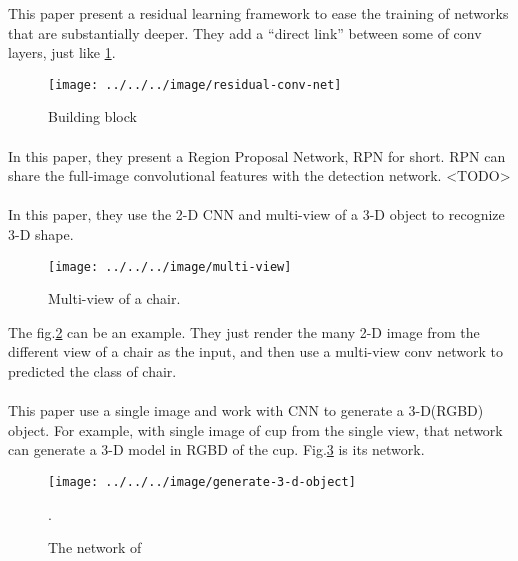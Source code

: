 \documentclass[border=0.5in]{blog}
\begin{document}
    This paper present a residual learning framework to ease the training of networks that are substantially deeper. They add a ``direct link'' between 
    some of conv layers, just like \ref{fig:residual-conv-net-block}.
    
    \begin{figure}
        \centering
        \texttt{[image: ../../../image/residual-conv-net]}
        \caption{Building block}
        \label{fig:residual-conv-net-block}
    \end{figure}
    
    \paragraph{\citep{DBLP:journals/corr/RenHG015}}
    
    In this paper, they present a Region Proposal Network, RPN for short.
    RPN can share the full-image convolutional features with the detection network.
    <TODO>
    
    \paragraph{\citep{DBLP:journals/corr/SuMKL15}}
    
    In this paper, they use the 2-D CNN and multi-view of a 3-D object to recognize
    3-D shape.
    \begin{figure}
        \centering
        \texttt{[image: ../../../image/multi-view]}
        \caption{Multi-view of a chair.}
        \label{fig:chair-multi-view}
    \end{figure}
    The fig.\ref{fig:chair-multi-view} can be an example. They just render the many
    2-D image from the different view of a chair as the input, and then use a multi-view conv network to predicted the class of chair.
    
    \paragraph{\citep{DBLP:journals/corr/TatarchenkoDB15}}
    
    This paper use a single image and work with CNN to generate a 3-D(RGBD) object.
    For example, with single image of cup from the single view, that network can
    generate a 3-D model in RGBD of the cup. Fig.\ref{fig:generate-3-d-object} is
    its network.
    
    \begin{figure}
        \centering
        \texttt{[image: ../../../image/generate-3-d-object]}
        \caption{The network of \citep{DBLP:journals/corr/TatarchenkoDB15}}.
        \label{fig:generate-3-d-object}
    \end{figure}
    
\end{document}
